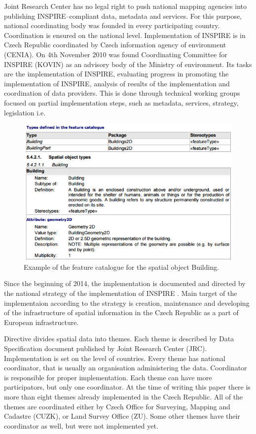 \documentclass[eprint]{actapoly}
\begin{document}
Joint Research Center has no legal right to push national mapping agencies into publishing INSPIRE--compliant data, metadata and services. For this purpose, national coordinating body was founded in every participating country. Coordination is ensured on the national level. Implementation of INSPIRE is in Czech Republic coordinated by Czech information agency of environment (CENIA). On 4th November 2010 was found Coordinating Committee for INSPIRE (KOVIN) as an advisory body of the Ministry of environment. Its tasks are the implementation of INSPIRE, evaluating progress in promoting the implementation of INSPIRE, analysis of results of the implementation and coordination of data providers. This is done through technical working groups focused on partial implementation steps, such as metadata, services, strategy, legislation i.e.
\cite{KOVIN - http://inspire.gov.cz/kovin}

\begin{figure}
\centering
\includegraphics[width=0.8\linewidth]{pics/feature_catalogue.png} %
\caption{Example of the feature catalogue for the spatial object Building.}
\label{fig:feature_catalogue}
\end{figure}

Since the beginning of 2014, the implementation is documented and directed by the national strategy of the implementation of INSPIRE \cite{strategie - http://inspire.gov.cz/sites/default/files/documents/Strategie ImplementaceINSPIRE.pdf}. Main target of the implementaion according to the strategy is creation, maintenance and developing of the infrastructure of spatial information in the Czech Republic as a part of European infrastructure.

Directive divides spatial data into themes. Each theme is described by Data Specification document published by Joint Research Center (JRC). Implementation is set on the level of countries. Every theme has national coordinator, that is usually an organisation administering the data. Coordinator is responsible for proper implementation. Each theme can have more participators, but only one coordinator. At the time of writing this paper there is more than eight themes already implemented in the Czech Republic. All of the themes are coordinated either by Czech Office for Surveying, Mapping and Cadastre (CUZK), or Land Survey Office (ZU). Some other themes have their coordinator as well, but were not implemented yet.
\end{document}
